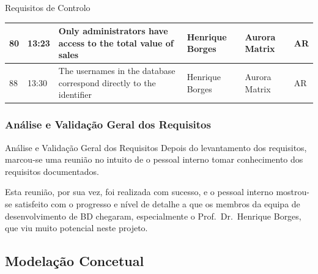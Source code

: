 \documentclass[compress,svgnames,handout,13.7pt]{beamer}
\begin{document}
\begin{frame}{Requisitos de Controlo}
\begin{table}[h]
{\begin{tabular}{|l|l| p{10cm}|l|l|l|}
        80 & 13:23 & Only administrators have access to the total value of sales & Henrique Borges & Aurora Matrix & AR \\ \hline
        88 & 13:30 & The usernames in the database correspond directly to the identifier & Henrique Borges & Aurora Matrix & AR \\ \hline
        \end{tabular}
        }
        \end{table}
\end{frame}

\subsubsection{Análise e Validação Geral dos Requisitos}
\begin{frame}{Análise e Validação Geral dos Requisitos}
Depois do levantamento dos requisitos, marcou-se uma reunião no intuito de o pessoal interno tomar conhecimento dos requisitos documentados.

Esta reunião, por sua vez, foi realizada com sucesso, e o pessoal interno mostrou-se satisfeito com o progresso e nível de detalhe a que os membros da equipa de desenvolvimento de BD chegaram, especialmente o Prof.\ Dr.\ Henrique Borges, que viu muito potencial neste projeto.
\end{frame}

\subsection{Modelação Concetual}
\end{document}
